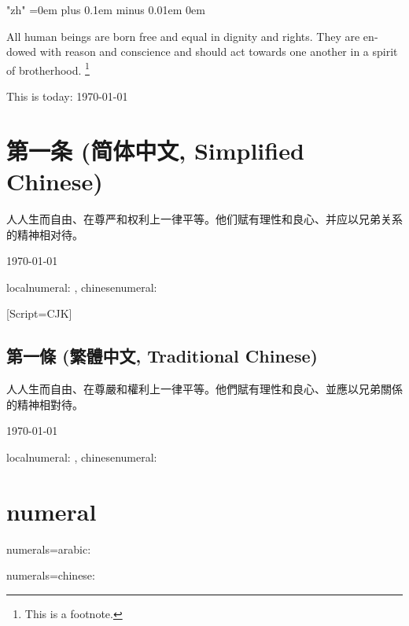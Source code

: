\documentclass{article}
\begin{document}
\XeTeXlinebreaklocale "zh"
\XeTeXlinebreakskip=0em plus 0.1em minus 0.01em
\parindent0em

\begin{center}
	\abstractname
\end{center}
\begin{english}
All human beings are born free and equal in dignity and rights.
They are endowed with reason and conscience and should act towards one another in a spirit of brotherhood.
\footnote{%
	This is a footnote.}

This is today: \today
\end{english}

\section{第一条 (简体中文, Simplified Chinese)}

人人生而自由、在尊严和权利上一律平等。他们赋有理性和良心、并应以兄弟关系的精神相对待。

\today

localnumeral: , chinesenumeral: 

\renewfontfamily{}[Script=CJK]
\begin{chinese}[variant=traditional,numerals=chinese]

\section{第一條 (繁體中文, Traditional Chinese)}

人人生而自由、在尊嚴和權利上一律平等。他們賦有理性和良心、並應以兄弟關係的精神相對待。

\today

localnumeral: , chinesenumeral: 

\end{chinese}

\section{numeral}
\begin{english}

numerals=arabic: 

numerals=chinese: 

\end{english}
\end{document}
